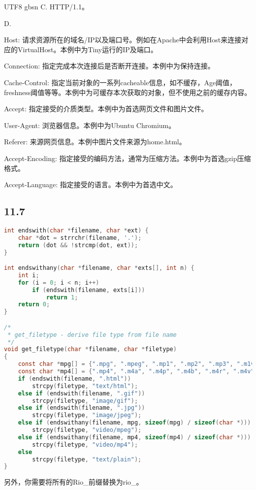 \documentclass {article}
\begin{document}
\begin {CJK*} {UTF8} {gbsn}
				C. HTTP/1.1。

				D.
				
				Host: 请求资源所在的域名/IP以及端口号。例如在Apache中会利用Host来连接对应的VirtualHost。本例中为Tiny运行的IP及端口。

				Connection: 指定完成本次连接后是否断开连接。本例中为保持连接。

				Cache-Control: 指定当前对象的一系列cacheable信息，如不缓存，Age阈值，freshness阈值等等。本例中为可缓存本次获取的对象，但不使用之前的缓存内容。

				Accept: 指定接受的介质类型。本例中为首选网页文件和图片文件。

				User-Agent: 浏览器信息。本例中为Ubuntu Chromium。

				Referer: 来源网页信息。本例中图片文件来源为home.html。

				Accept-Encoding: 指定接受的编码方法，通常为压缩方法。本例中为首选gzip压缩格式。

				Accept-Language: 指定接受的语言。本例中为首选中文。

			\subsection{11.7}
				\begin{lstlisting}[language=C]
int endswith(char *filename, char *ext) {
	char *dot = strrchr(filename, '.');
	return (dot && !strcmp(dot, ext));
}

int endswithany(char *filename, char *exts[], int n) {
	int i;
	for (i = 0; i < n; i++)
		if (endswith(filename, exts[i]))
			return 1;
	return 0;
}

/*
 * get_filetype - derive file type from file name
 */
void get_filetype(char *filename, char *filetype) 
{
	const char *mpg[] = {".mpg", ".mpeg", ".mp1", ".mp2", ".mp3", ".m1v", ".m1a", ".m2a", ".mpa", ".mpv"};
	const char *mp4[] = {".mp4", ".m4a", ".m4p", ".m4b", ".m4r", ".m4v"};
	if (endswith(filename, ".html"))
		strcpy(filetype, "text/html");
	else if (endswith(filename, ".gif"))
		strcpy(filetype, "image/gif");
	else if (endswith(filename, ".jpg"))
		strcpy(filetype, "image/jpeg");
	else if (endswithany(filename, mpg, sizeof(mpg) / sizeof(char *)))
		strcpy(filetype, "video/mpeg");
	else if (endswithany(filename, mp4, sizeof(mp4) / sizeof(char *)))
		strcpy(filetype, "video/mp4");
	else
		strcpy(filetype, "text/plain");
}
				\end{lstlisting}

				另外，你需要将所有的Rio\_前缀替换为rio\_。


  \end {CJK*}
\end{document}
